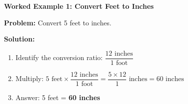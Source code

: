 \documentclass[12pt, letterpaper, fleqn]{article}
\begin{document}
\vspace{4mm}

\begin{tcolorbox}[colback=white, colframe=black!25, boxrule=0.6pt, arc=4mm, left=6mm, right=6mm, top=5mm, bottom=5mm]

\textbf{Worked Example 1: Convert Feet to Inches}

\medskip

\textbf{Problem:} Convert 5 feet to inches.

\medskip

\noindent

\vspace{1cm}
\textbf{Solution:}

\begin{enumerate}
    \item Identify the conversion ratio: $\dfrac{12 \text{ inches}}{1 \text{ foot}}$
    \vspace{1cm}
    \item Multiply: $5 \text{ feet} \times \dfrac{12 \text{ inches}}{1 \text{ foot}} = \dfrac{5 \times 12}{1} \text{ inches} = 60 \text{ inches}$
    \vspace{1cm}
    \item Answer: 5 feet = \textbf{60 inches}
\end{enumerate}

\end{tcolorbox}

\vspace{0.2cm}
\end{document}
